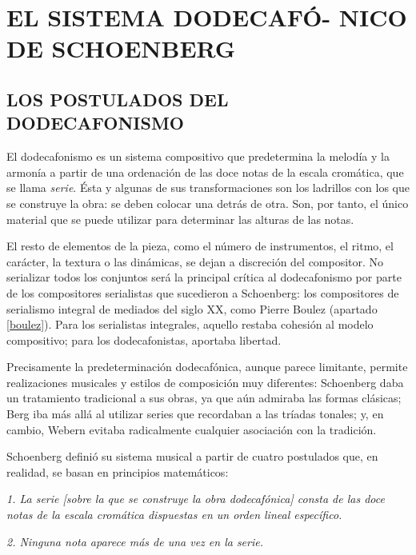 \chapter[EL SISTEMA DODECAFÓNICO DE SCHOENBERG]{EL SISTEMA DODECAFÓ- NICO DE SCHOENBERG}
	\section{LOS POSTULADOS DEL DODECAFONISMO}
		El dodecafonismo es un sistema compositivo que predetermina la melodía y la armonía a partir de una ordenación de las doce notas de la escala cromática, que se llama \textit{serie}. Ésta y algunas de sus transformaciones son los ladrillos con los que se construye la obra: se deben colocar una detrás de otra. Son, por tanto, el único material que se puede utilizar para determinar las alturas de las notas.
		
		El resto de elementos de la pieza, como el número de instrumentos, el ritmo, el carácter, la textura o las dinámicas, se dejan a discreción del compositor. No serializar todos los conjuntos será la principal crítica al dodecafonismo por parte de los compositores serialistas que sucedieron a Schoenberg: los compositores de serialismo integral de mediados del siglo XX, como Pierre Boulez (apartado \ref{boulez}). Para los serialistas integrales, aquello restaba cohesión al modelo compositivo; para los dodecafonistas, aportaba libertad.
		
		Precisamente la predeterminación dodecafónica, aunque parece limitante, permite realizaciones musicales y estilos de composición muy diferentes: Schoenberg daba un tratamiento tradicional a sus obras, ya que aún admiraba las formas clásicas; Berg iba más allá al utilizar series que recordaban a las tríadas tonales; y, en cambio, Webern evitaba radicalmente cualquier asociación con la tradición.
		
		Schoenberg definió su sistema musical a partir de cuatro postulados que, en realidad, se basan en principios matemáticos:
		
		\emph{1. La serie \emph{[sobre la que se construye la obra dodecafónica]} consta de las doce notas de la escala cromática dispuestas en un orden lineal específico.}
		
		\emph{2. Ninguna nota aparece más de una vez en la serie.}
		
